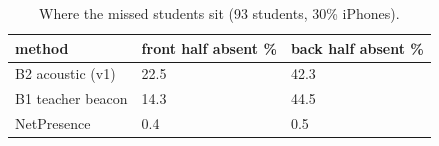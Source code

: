 \begin{table}[t]
\centering
\caption{Where the missed students sit (93 students, 30\% iPhones).}\label{tab:e10}
\begin{tabular}{lll}
\toprule
method & front half absent \% & back half absent \% \\
\midrule
B2 acoustic (v1) & 22.5 & 42.3 \\
B1 teacher beacon & 14.3 & 44.5 \\
NetPresence & 0.4 & 0.5 \\
\bottomrule
\end{tabular}
\end{table}
